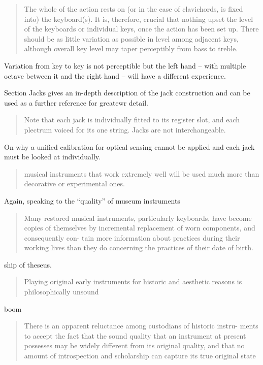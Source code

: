 \begin{quotation}
    The whole of the action rests on (or in the case of clavichords, is fixed
    into) the keyboard(s). It is, therefore, crucial that nothing upset the
    level of the keyboards or individual keys, once the action has been set up.
    There should be as little variation as possible in level among adjacent
    keys, although overall key level may taper perceptibly from bass to treble.
\end{quotation}

Variation from key to key is not perceptible but the left hand -- with multiple
octave between it and the right hand -- will have a different experience.

Section Jacks gives an in-depth description of the jack construction and can be
used as a further reference for greatewr detail.


\begin{quotation}
    Note that each jack is individually fitted to its register slot, and each
    plectrum voiced for its one string. Jacks are not interchangeable.
\end{quotation}

On why a unified calibration for optical sensing cannot be applied and each jack
must be looked at individually.

\begin{quotation}
    musical instruments that work extremely well will be used much more than
    decorative or experimental ones.
\end{quotation}

Again, speaking to the ``quality'' of museum instruments

\begin{quotation}
    Many restored musical instruments, particularly keyboards, have become
copies of themselves by incremental replacement of worn components, and
consequently con- tain more information about practices during their working
lives than they do concerning the practices of their date of birth.
\end{quotation}

ship of theseus.

\begin{quotation}
    Playing original early instruments for historic and aesthetic reasons is
    philosophically unsound
\end{quotation}

boom

\begin{quotation}
    There is an apparent reluctance among custodians of historic instru- ments
    to accept the fact that the sound quality that an instrument at present
    possesses may be widely different from its original quality, and that no
    amount of introspection and scholarship can capture its true original state
\end{quotation}

